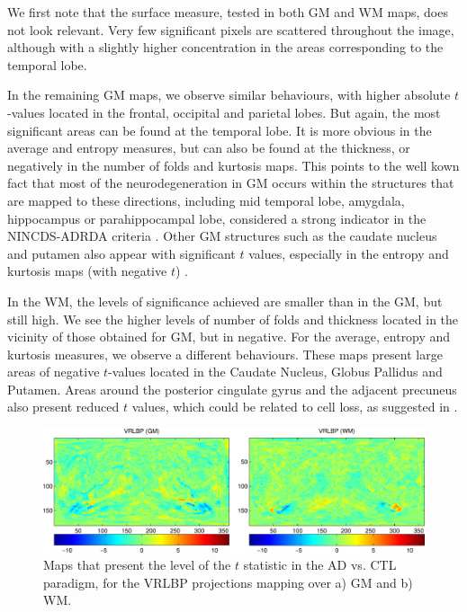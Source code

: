 We first note that the surface measure, tested in both \ac{GM} and \ac{WM} maps, does not look relevant. Very few significant pixels are scattered throughout the image, although with a slightly higher concentration in the areas corresponding to the temporal lobe. 

In the remaining \ac{GM} maps, we observe similar behaviours, with higher absolute $t$-values located in the frontal, occipital and parietal lobes. But again, the most significant areas can be found at the temporal lobe. It is more obvious in the average and entropy measures, but can also be found at the thickness, or negatively in the number of folds and kurtosis maps. This points to the well kown fact that most of the neurodegeneration in \ac{GM} occurs within the structures that are mapped to these directions, including mid temporal lobe, amygdala, hippocampus or parahippocampal lobe, considered a strong indicator in the NINCDS-ADRDA criteria \cite{Dubois2007}. Other \ac{GM} structures such as the caudate nucleus and putamen also appear with significant $t$ values, especially in the entropy and kurtosis maps (with negative $t$) \cite{Pievani2013}. 

In the \ac{WM}, the levels of significance achieved are smaller than in the \ac{GM}, but still high. We see the higher levels of number of folds and thickness located in the vicinity of those obtained for \ac{GM}, but in negative. For the average, entropy and kurtosis measures, we observe a different behaviours. These maps present large areas of negative $t$-values located in the Caudate Nucleus, Globus Pallidus and Putamen. Areas around the posterior cingulate gyrus and the adjacent precuneus also present reduced $t$ values, which could be related to cell loss, as suggested in \cite{Baron2001}.

\begin{figure}[htp]
	\centering
	\includegraphics[width=\textwidth]{Graphics/ch6/09-tmaps_vrlbp}
	\caption{Maps that present the level of the $t$ statistic in the \ac{AD} vs. \ac{CTL} paradigm, for the VRLBP projections mapping over a) \ac{GM} and b) \ac{WM}. }
	\label{fig:tmapvrlbp}
\end{figure}

